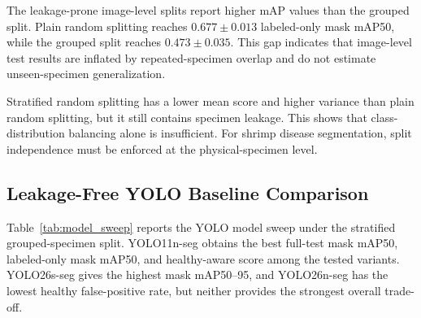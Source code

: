 \documentclass{svproc}
\begin{document}
The leakage-prone image-level splits report higher mAP values than the grouped split. Plain random splitting reaches $0.677 \pm 0.013$ labeled-only mask mAP50, while the grouped split reaches $0.473 \pm 0.035$. This gap indicates that image-level test results are inflated by repeated-specimen overlap and do not estimate unseen-specimen generalization.

\begin{table}
\caption{Three-seed split-policy summary using YOLO11n-seg. Values are mean $\pm$ standard deviation.}
\label{tab:split_policy_summary}
\begin{center}
\scriptsize
\setlength{\tabcolsep}{3pt}
\renewcommand{\arraystretch}{1.08}
\end{center}
\end{table}

Stratified random splitting has a lower mean score and higher variance than plain random splitting, but it still contains specimen leakage. This shows that class-distribution balancing alone is insufficient. For shrimp disease segmentation, split independence must be enforced at the physical-specimen level.

\subsection{Leakage-Free YOLO Baseline Comparison}

Table~\ref{tab:model_sweep} reports the YOLO model sweep under the stratified grouped-specimen split. YOLO11n-seg obtains the best full-test mask mAP50, labeled-only mask mAP50, and healthy-aware score among the tested variants. YOLO26s-seg gives the highest mask mAP50--95, and YOLO26n-seg has the lowest healthy false-positive rate, but neither provides the strongest overall trade-off.
\end{document}
